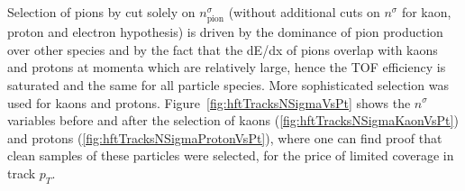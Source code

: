\noindent Selection of pions by cut solely on $n^{\sigma}_{\text{pion}}$ (without additional cuts on $n^{\sigma}$ for kaon, proton and electron hypothesis) is driven by the dominance of pion production over other species and by the fact that the dE/dx of pions overlap with kaons and protons at momenta which are relatively large, hence the TOF efficiency is saturated and the same for all particle species. More sophisticated selection was used for kaons and protons. Figure~\ref{fig:hftTracksNSigmaVsPt} shows the $n^{\sigma}$ variables before and after the selection of kaons (\ref{fig:hftTracksNSigmaKaonVsPt}) and protons (\ref{fig:hftTracksNSigmaProtonVsPt}), where one can find proof that clean samples of these particles were selected, for the price of limited coverage in track $p_{T}$.
\begin{figure}[t!]
\centering
\parbox{0.4725\textwidth}{
  \centering
  \begin{subfigure}[b]{\linewidth}
                \vspace{-5pt}
  \end{subfigure}
}%
\quad\quad%
\parbox{0.4725\textwidth}{
  \centering
  \begin{subfigure}[b]{\linewidth}

\end{subfigure}}
\end{figure}
